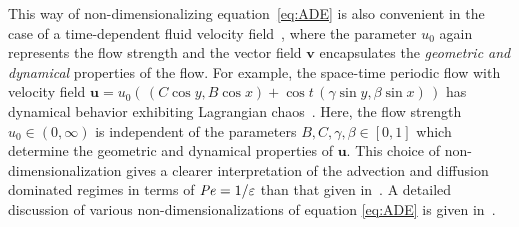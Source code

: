 \documentclass[english,12pt,jmp,graphicx]{revtex4-1}
\newcommand{\Pen}{\mbox{\textit{Pe}}}  %
\newcommand{\vecu}{\boldsymbol{u}}
\newcommand{\vecv}{\boldsymbol{v}}
\newcommand{\secref}[1]{Section~\ref{#1}}
\newcommand{\Dg}{\mathfrak{D}}
\begin{document}
This way of non-dimensionalizing equation~\eqref{eq:ADE} is also
convenient in the case of a time-dependent fluid velocity
field~\cite{Murphy:ADSTPF-2017}, where the parameter $u_0$ again
represents the flow strength and the vector field $\vecv$ encapsulates 
the \emph{geometric and dynamical} properties of the flow. For example, the
space-time periodic flow with velocity field
$\vecu=u_0(\,(C\cos{y},B\cos{x})+\cos{t}\,(\gamma\sin{y},\beta\sin{x})\,)$
has dynamical behavior exhibiting Lagrangian
chaos~\cite{Biferale:PF:2725,Murphy:ADSTPF-2017}. Here, the flow 
strength $u_0\in(0,\infty)$ is independent of the parameters
$B,C,\gamma,\beta\in[0,1]$ which determine the geometric and dynamical
properties of $\vecu$. This choice of non-dimensionalization gives a
clearer interpretation of the advection and diffusion dominated
regimes in terms of $\Pen=1/\varepsilon$ than that given
in~\cite{Murphy:ADSTPF-2017}.  A detailed discussion of various
non-dimensionalizations of equation \eqref{eq:ADE}
is given in~\cite{McLaughlin:Forest:PF:1999:880,Majda:Kramer:1999:book}.





\end{document}
